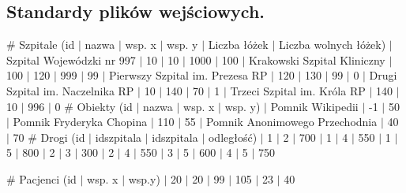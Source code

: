 \documentclass{article}
\begin{document}
\subsection{Standardy plików wejściowych.}
\begin{tcolorbox}[title={Przykładowy plik zawierający dane szpitali, granic kraju i dróg miedzy szpitalami.}]
\# Szpitale (id $|$ nazwa $|$ wsp. x $|$ wsp. y $|$ Liczba łóżek $|$ Liczba wolnych łóżek)
 $|$ Szpital Wojewódzki nr 997 $|$ 10 $|$ 10 $|$ 1000 $|$ 100
 $|$ Krakowski Szpital Kliniczny $|$ 100 $|$ 120 $|$ 999 $|$ 99
 $|$ Pierwszy Szpital im. Prezesa RP $|$ 120 $|$ 130 $|$ 99 $|$ 0
 $|$ Drugi Szpital im. Naczelnika RP $|$ 10 $|$ 140 $|$ 70 $|$ 1
 $|$ Trzeci Szpital im. Króla RP $|$ 140 $|$ 10 $|$ 996 $|$ 0
\newline 	
\newline \# Obiekty (id $|$ nazwa $|$ wsp. x $|$ wsp. y)
 $|$ Pomnik Wikipedii $|$ -1 $|$ 50
 $|$ Pomnik Fryderyka Chopina $|$ 110 $|$ 55
 $|$ Pomnik Anonimowego Przechodnia $|$ 40 $|$ 70
\newline 
\newline \# Drogi (id $|$ id\textunderscore szpitala $|$ id\textunderscore szpitala $|$ odległość)
 $|$ 1 $|$ 2 $|$ 700
 $|$ 1 $|$ 4 $|$ 550
 $|$ 1 $|$ 5 $|$ 800
 $|$ 2 $|$ 3 $|$ 300
 $|$ 2 $|$ 4 $|$ 550
 $|$ 3 $|$ 5 $|$ 600
 $|$ 4 $|$ 5 $|$ 750
\end{tcolorbox}

\begin{tcolorbox}[title={Przykładowy plik zawierający dane pacjentów potrzebujących wolnego łóżka w szpitalu.}]
\# Pacjenci (id $|$ wsp. x $|$ wsp.y)
 $|$ 20 $|$ 20
 $|$ 99 $|$ 105
 $|$ 23 $|$ 40
\end{tcolorbox}
\newpage
\end{document}
